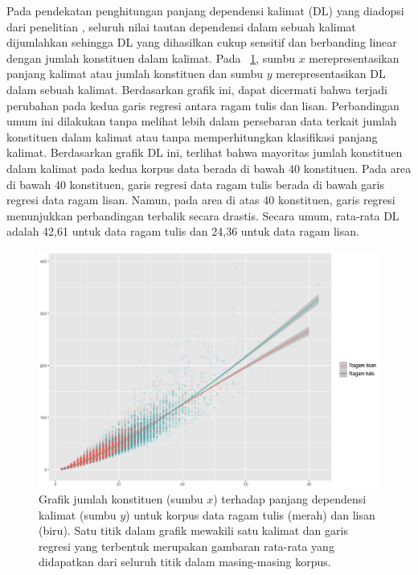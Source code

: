 Pada pendekatan penghitungan panjang dependensi kalimat (DL) yang diadopsi dari penelitian \cite{futrell2015large}, seluruh nilai tautan dependensi dalam sebuah kalimat dijumlahkan sehingga DL yang dihasilkan cukup sensitif dan berbanding linear dengan jumlah konstituen dalam kalimat. Pada \pic~\ref{fig:lisantulis_DL}, sumbu $x$ merepresentasikan panjang kalimat atau jumlah konstituen dan sumbu $y$ merepresentasikan DL dalam sebuah kalimat. Berdasarkan grafik ini, dapat dicermati bahwa terjadi perubahan pada kedua garis regresi antara ragam tulis dan lisan. Perbandingan umum ini dilakukan tanpa melihat lebih dalam persebaran data terkait jumlah konstituen dalam kalimat atau tanpa memperhitungkan klasifikasi panjang kalimat. Berdasarkan grafik DL ini, terlihat bahwa mayoritas jumlah konstituen dalam kalimat pada kedua korpus data berada di bawah 40 konstituen. Pada area di bawah 40 konstituen, garis regresi data ragam tulis berada di bawah garis regresi data ragam lisan. Namun, pada area di atas 40 konstituen, garis regresi menunjukkan perbandingan terbalik secara drastis. Secara umum, rata-rata DL adalah 42,61 untuk data ragam tulis dan 24,36 untuk data ragam lisan. 

\begin{figure}
	\centering \includegraphics[width=1
	\textwidth] {pics/lisantulis_DL.png} 
	\caption{Grafik jumlah konstituen (sumbu $x$) terhadap panjang dependensi kalimat (sumbu $y$) untuk korpus data ragam tulis (merah) dan lisan (biru). Satu titik dalam grafik mewakili satu kalimat dan garis regresi yang terbentuk merupakan gambaran rata-rata yang didapatkan dari seluruh titik dalam masing-masing korpus.} 
\label{fig:lisantulis_DL} 
\end{figure}

